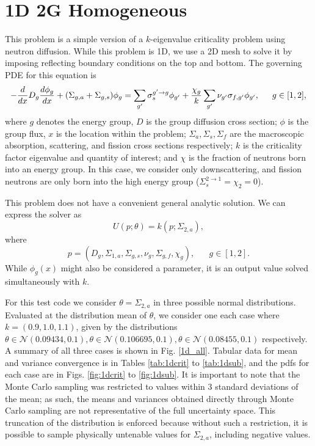 \section{1D 2G Homogeneous}
This problem is a simple version of a $k$-eigenvalue criticality problem using neutron diffusion.  While this problem is 1D, we use a 2D mesh to solve it by imposing reflecting boundary conditions on the top and bottom.  The governing PDE for this equation is
\begin{equation}
-\frac{d }{d x}D_g\frac{d \phi_g}{d x}+(\Sigma_{g,a}+\Sigma_{g,s})\phi_g = \sum_{g'}\sigma_{s}^{g'\to g}\phi_{g'} + \frac{\chi_{g}}{k}\sum_{g'}\nu_{g'}\sigma_{f,g'}\phi_{g'},\hspace{15pt} g\in[1,2],
\end{equation}
where $g$ denotes the energy group, $D$ is the group diffusion cross section; $\phi$ is the group flux, $x$ is the location within the problem; $\Sigma_a,\Sigma_s,\Sigma_f$ are the macroscopic absorption, scattering, and fission cross sections respectively; $k$ is the criticality factor eigenvalue and quantity of interest; and $\chi$ is the fraction of neutrons born into an energy group.  In this case, we consider only downscattering, and fission neutrons are only born into the high energy group ($\Sigma_s^{2\to1}=\chi_2=0$).

This problem does not have a convenient general analytic solution.  We can express the solver as
\begin{equation}
U(p;\theta) = k(p;\Sigma_{2,a}),
\end{equation}
where
\begin{equation}
p=(D_g,\Sigma_{1,a},\Sigma_{g,s},\nu_g,\Sigma_{g,f},\chi_g),\hspace{20pt}g\in[1,2].
\end{equation}
While $\phi_g(x)$ might also be considered a parameter, it is an output value solved simultaneously with $k$.

For this test code we consider $\theta=\Sigma_{2,a}$ in three possible normal distributions.  Evaluated at the distribution mean of $\theta$, we consider one each case where $k=(0.9,1.0,1.1)$, given by the distributions $\theta\in\mathcal{N}(0.09434,0.1), \theta\in\mathcal{N}(0.106695,0.1), \theta\in\mathcal{N}(0.08455,0.1)$ respectively.  A summary of all three cases is shown in Fig. \ref{1d_all}.  Tabular data for mean and variance convergence is in Tables \ref{tab:1dcrit} to \ref{tab:1dsub}, and the pdfs for each case are in Figs. \ref{fig:1dcrit} to \ref{fig:1dsub}.  It is important to note that the Monte Carlo sampling was restricted to values within 3 standard deviations of the mean; as such, the means and variances obtained directly through Monte Carlo sampling are not representative of the full uncertainty space.  This truncation of the distribution is enforced because without such a restriction, it is possible to sample physically untenable values for $\Sigma_{2,a}$, including negative values.

